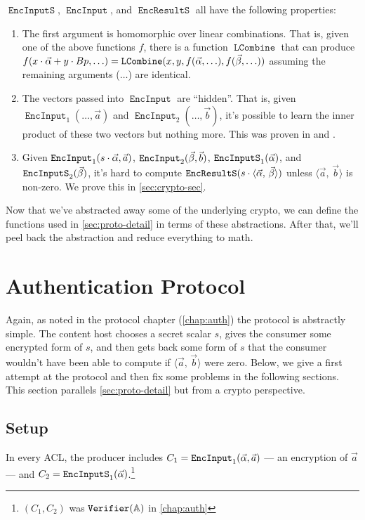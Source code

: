 \documentclass[pdftex,12pt,a4papaer,twoside,notitlepage]{report}
\newcommand{\iprod}[2]{\langle #1,\,#2\rangle}
\DeclareMathOperator{\ein}{\mathtt{EncInput}}
\DeclareMathOperator{\combine}{\mathtt{LCombine}}
\DeclareMathOperator{\eins}{\mathtt{EncInputS}}
\DeclareMathOperator{\eouts}{\mathtt{EncResultS}}
\begin{document}
$\eins$, $\ein$, and $\eouts$ all have the following properties: 
\begin{enumerate}
\item The first argument is homomorphic over linear combinations. That is, given
  one of the above functions $f$, there is a function $\combine$ that can
  produce $f(x\cdot \Ap + y\cdot Bp, \ldots) = \combine(x, y, f(\Ap,
  \ldots),f(\Bp, \ldots))$ assuming the remaining arguments
  ($\ldots$) are identical.
\item The vectors passed into $\ein$ are ``hidden''. That is, given
  $\ein_1(\ldots, \vec{a})$ and $\ein_2(\ldots, \vec{b})$, it's possible to
  learn the inner product of these two vectors but nothing more. This was proven
  in \cite{inner-product} and \cite{inner-product-ext}.
\item \sloppy Given $\ein_1(s \cdot \Ap, \vec{a})$, $\ein_2(\Bp, \vec{b})$,
  $\eins_1(\Ap)$, and $\eins_2(\Bp)$, it's hard to compute $\eouts(s\cdot\ABp)$
  unless $\iprod{\vec{a}}{\vec{b}}$ is non-zero. We prove this in
  \cref{sec:crypto-sec}.
\end{enumerate}

Now that we've abstracted away some of the underlying crypto, we can define the
functions used in \cref{sec:proto-detail} in terms of these abstractions. After
that, we'll peel back the abstraction and reduce everything to math.

\section{Authentication Protocol}

Again, as noted in the protocol chapter (\cref{chap:auth}) the protocol is
abstractly simple. The content host chooses a secret scalar $s$, gives the
consumer some encrypted form of $s$, and then gets back some form of $s$ that
the consumer wouldn't have been able to compute if $\iprod{\vec{a}}{\vec{b}}$
were zero. Below, we give a first attempt at the protocol and then fix some
problems in the following sections. This section parallels
\cref{sec:proto-detail} but from a crypto perspective.

\subsection{Setup}

In every ACL, the producer includes $C_1 = \ein_1(\Ap, \vec{a})$ --- an
encryption of $\vec{a}$ --- and $C_2 = \eins_1(\Ap)$.\footnote{$(C_1, C_2)$ was
  $\operatorname{\mathtt{Verifier}}(\mathbb{A})$ in \cref{chap:auth}}
\end{document}

